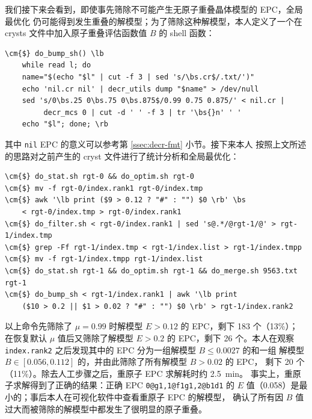 我们接下来会看到，即使事先筛除不可能产生无原子重叠晶体模型的 EPC，全局最优化
仍可能得到发生重叠的解模型；为了筛除这种解模型，本人定义了一个在 crysts
文件中加入原子重叠评估函数值 $B$ 的 shell 函数：
\begin{Verbatim}
\cm{$} do_bump_sh() \lb
	while read l; do
	name="$(echo "$l" | cut -f 3 | sed 's/\bs.cr$/.txt/')"
	echo 'nil.cr nil' | decr_utils dump "$name" > /dev/null
	sed 's/0\bs.25 0\bs.75 0\bs.875$/0.99 0.75 0.875/' < nil.cr |
	     decr_mcs 0 | cut -d ' ' -f 3 | tr '\bs{}n' ' '
	echo "$l"; done; \rb
\end{Verbatim}
其中 \verb|nil| EPC 的意义可以参考第 \ref{ssec:decr-fmt} 小节。接下来本人
按照上文所述的思路对之前产生的 cryst 文件进行了统计分析和全局最优化：
\begin{Verbatim}
\cm{$} do_stat.sh rgt-0 && do_optim.sh rgt-0
\cm{$} mv -f rgt-0/index.rank1 rgt-0/index.tmp
\cm{$} awk '\lb print ($9 > 0.12 ? "#" : "") $0 \rb' \bs
	< rgt-0/index.tmp > rgt-0/index.rank1
\cm{$} do_filter.sh < rgt-0/index.rank1 | sed 's@.*/@rgt-1/@' > rgt-1/index.tmp
\cm{$} grep -Ff rgt-1/index.tmp < rgt-1/index.list > rgt-1/index.tmpp
\cm{$} mv -f rgt-1/index.tmpp rgt-1/index.list
\cm{$} do_stat.sh rgt-1 && do_optim.sh rgt-1 && do_merge.sh 9563.txt rgt-1
\cm{$} do_bump_sh < rgt-1/index.rank1 | awk '\lb print
	($10 > 0.2 || $1 > 0.02 ? "#" : "") $0 \rb' > rgt-1/index.rank2
\end{Verbatim}
以上命令先筛除了 $\mu = 0.99$ 时解模型 $E > 0.12$ 的 EPC，剩下 183 个（13\%）；
在恢复默认 $\mu$ 值后又筛除了解模型 $E > 0.2$ 的 EPC，剩下 26 个。本人在观察
\verb|index.rank2| 之后发现其中的 EPC 分为一组解模型 $B \leq 0.0027$ 的和一组
解模型 $B \in [0.056, 0.112]$ 的，并由此筛除了所有解模型 $B > 0.02$ 的 EPC，
剩下 20 个（11\%）。除去人工步骤之后，重原子 EPC 求解耗时约 \SI{2.5}{\minute}。
事实上，重原子求解得到了正确的结果：正确 EPC \verb|0@g1,1@f1g1,2@b1d1| 的
$E$ 值（0.058）是最小的；事后本人在可视化软件中查看重原子 EPC 的解模型，
确认了所有因 $B$ 值过大而被筛除的解模型中都发生了很明显的原子重叠。

